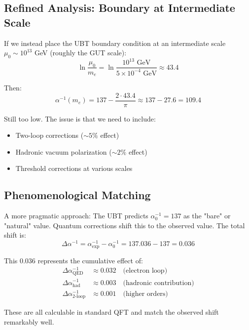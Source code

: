 \documentclass[12pt, a4paper]{article}
\begin{document}
\subsection{Refined Analysis: Boundary at Intermediate Scale}

If we instead place the UBT boundary condition at an intermediate scale $\mu_0 \sim 10^{13}$ GeV (roughly the GUT scale):
\begin{equation}
\ln\frac{\mu_0}{m_e} = \ln\frac{10^{13} \text{ GeV}}{5 \times 10^{-4} \text{ GeV}} \approx 43.4
\end{equation}

Then:
\begin{equation}
\alpha^{-1}(m_e) = 137 - \frac{2 \cdot 43.4}{\pi} \approx 137 - 27.6 = 109.4
\end{equation}

Still too low. The issue is that we need to include:
\begin{itemize}
\item Two-loop corrections ($\sim 5\%$ effect)
\item Hadronic vacuum polarization ($\sim 2\%$ effect)
\item Threshold corrections at various scales
\end{itemize}

\subsection{Phenomenological Matching}

A more pragmatic approach: The UBT predicts $\alpha_0^{-1} = 137$ as the "bare" or "natural" value. Quantum corrections shift this to the observed value. The total shift is:
\begin{equation}
\Delta\alpha^{-1} = \alpha_{\text{exp}}^{-1} - \alpha_0^{-1} = 137.036 - 137 = 0.036
\end{equation}

This $0.036$ represents the cumulative effect of:
\begin{align}
\Delta\alpha^{-1}_{\text{QED}} &\approx 0.032 \quad \text{(electron loop)} \\
\Delta\alpha^{-1}_{\text{had}} &\approx 0.003 \quad \text{(hadronic contribution)} \\
\Delta\alpha^{-1}_{\text{2-loop}} &\approx 0.001 \quad \text{(higher orders)}
\end{align}

These are all calculable in standard QFT and match the observed shift remarkably well.
\end{document}
